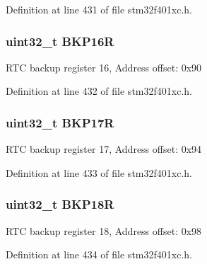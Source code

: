 Definition at line 431 of file stm32f401xc.\+h.

\subsubsection[{\texorpdfstring{B\+K\+P16R}{BKP16R}}]{ uint32\+\_\+t B\+K\+P16R}\hypertarget{struct_r_t_c___type_def_ad2f2eb2fb4b93e21515b10e920e719b6}{}\label{struct_r_t_c___type_def_ad2f2eb2fb4b93e21515b10e920e719b6}
R\+TC backup register 16, Address offset\+: 0x90 

Definition at line 432 of file stm32f401xc.\+h.

\subsubsection[{\texorpdfstring{B\+K\+P17R}{BKP17R}}]{ uint32\+\_\+t B\+K\+P17R}\hypertarget{struct_r_t_c___type_def_a2842aa523df62f3508316eb3b2e08f4e}{}\label{struct_r_t_c___type_def_a2842aa523df62f3508316eb3b2e08f4e}
R\+TC backup register 17, Address offset\+: 0x94 

Definition at line 433 of file stm32f401xc.\+h.

\subsubsection[{\texorpdfstring{B\+K\+P18R}{BKP18R}}]{ uint32\+\_\+t B\+K\+P18R}\hypertarget{struct_r_t_c___type_def_a640ccb2ccfb6316b88c070362dc29339}{}\label{struct_r_t_c___type_def_a640ccb2ccfb6316b88c070362dc29339}
R\+TC backup register 18, Address offset\+: 0x98 

Definition at line 434 of file stm32f401xc.\+h.

